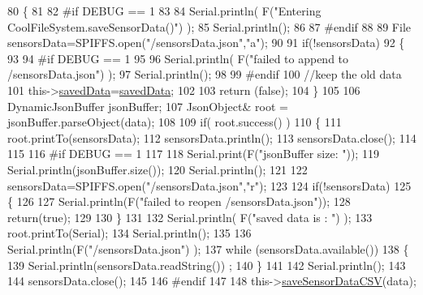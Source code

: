 \begin{DoxyCode}
80 \{
81 
82 \textcolor{preprocessor}{#if DEBUG == 1}
83 
84     Serial.println( F(\textcolor{stringliteral}{"Entering CoolFileSystem.saveSensorData()"}) );
85     Serial.println();
86 
87 \textcolor{preprocessor}{#endif}
88     
89     File sensorsData=SPIFFS.open(\textcolor{stringliteral}{"/sensorsData.json"},\textcolor{stringliteral}{"a"});
90 
91     \textcolor{keywordflow}{if}(!sensorsData)
92     \{
93     
94 \textcolor{preprocessor}{    #if DEBUG == 1}
95     
96         Serial.println( F(\textcolor{stringliteral}{"failed to append to /sensorsData.json"}) );
97         Serial.println();
98     
99 \textcolor{preprocessor}{    #endif}
100         \textcolor{comment}{//keep the old data}
101         this->\hyperlink{class_cool_file_system_ad9f5b739a32100f5f21270c3d9ee2b1d}{savedData}=\hyperlink{class_cool_file_system_ad9f5b739a32100f5f21270c3d9ee2b1d}{savedData};
102 
103         \textcolor{keywordflow}{return} (\textcolor{keyword}{false}); 
104     \}   
105 
106     DynamicJsonBuffer jsonBuffer;
107     JsonObject& root = jsonBuffer.parseObject(data);
108 
109     \textcolor{keywordflow}{if}( root.success() )
110     \{
111         root.printTo(sensorsData);
112         sensorsData.println();
113         sensorsData.close();
114 
115 
116 \textcolor{preprocessor}{    #if DEBUG == 1}
117         
118         Serial.print(F(\textcolor{stringliteral}{"jsonBuffer size: "}));
119         Serial.println(jsonBuffer.size());
120         Serial.println();
121 
122         sensorsData=SPIFFS.open(\textcolor{stringliteral}{"/sensorsData.json"},\textcolor{stringliteral}{"r"});
123         
124         \textcolor{keywordflow}{if}(!sensorsData)
125         \{
126             
127             Serial.println(F(\textcolor{stringliteral}{"failed to reopen /sensorsData.json"}));
128             \textcolor{keywordflow}{return}(\textcolor{keyword}{true});
129                         
130         \}
131     
132         Serial.println( F(\textcolor{stringliteral}{"saved data is : "}) );
133         root.printTo(Serial);
134         Serial.println();
135 
136         Serial.println(F(\textcolor{stringliteral}{"/sensorsData.json"}) );
137         \textcolor{keywordflow}{while} (sensorsData.available()) 
138         \{
139             Serial.println(sensorsData.readString()) ;
140         \}
141         
142         Serial.println();
143         
144         sensorsData.close();
145     
146 \textcolor{preprocessor}{    #endif}
147 
148         this->\hyperlink{class_cool_file_system_ab78704d5d21ce10fc6f1138ab5ab46c8}{saveSensorDataCSV}(data);     

\end{DoxyCode}
